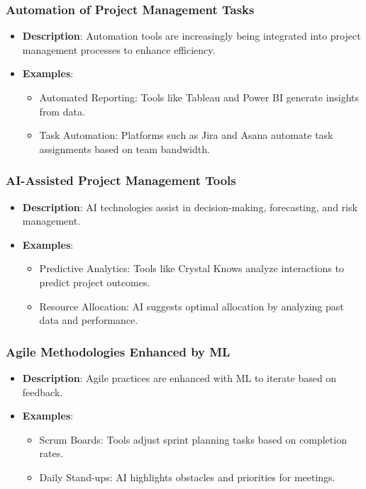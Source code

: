 \documentclass[aspectratio=169]{beamer}
\begin{document}
\begin{frame}[fragile]
    \frametitle{Automation of Project Management Tasks}
    \begin{itemize}
        \item \textbf{Description}: Automation tools are increasingly being integrated into project management processes to enhance efficiency.
        \item \textbf{Examples}:
        \begin{itemize}
            \item Automated Reporting: Tools like Tableau and Power BI generate insights from data.
            \item Task Automation: Platforms such as Jira and Asana automate task assignments based on team bandwidth.
        \end{itemize}
    \end{itemize}
\end{frame}

\begin{frame}[fragile]
    \frametitle{AI-Assisted Project Management Tools}
    \begin{itemize}
        \item \textbf{Description}: AI technologies assist in decision-making, forecasting, and risk management.
        \item \textbf{Examples}:
        \begin{itemize}
            \item Predictive Analytics: Tools like Crystal Knows analyze interactions to predict project outcomes.
            \item Resource Allocation: AI suggests optimal allocation by analyzing past data and performance.
        \end{itemize}
    \end{itemize}
\end{frame}

\begin{frame}[fragile]
    \frametitle{Agile Methodologies Enhanced by ML}
    \begin{itemize}
        \item \textbf{Description}: Agile practices are enhanced with ML to iterate based on feedback.
        \item \textbf{Examples}:
        \begin{itemize}
            \item Scrum Boards: Tools adjust sprint planning tasks based on completion rates.
            \item Daily Stand-ups: AI highlights obstacles and priorities for meetings.
        \end{itemize}
    \end{itemize}
\end{frame}
\end{document}
